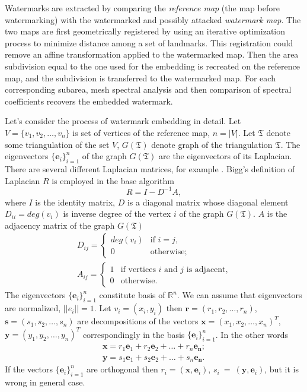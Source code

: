 \documentclass{article}
\begin{document}
Watermarks are extracted by comparing the \textit{reference map} (the map before watermarking) with the watermarked and possibly attacked \textit{watermark map}. The two maps are first geometrically registered by
using an iterative optimization process to minimize distance among a set of landmarks. This registration could remove an affine transformation applied to the watermarked map. Then the area subdivision 
equal to the one used for the embedding is recreated on the reference map, and the subdivision is transferred to the watermarked map. For each corresponding subarea, mesh spectral analysis and then comparison of
spectral coefficients recovers the embedded watermark.

Let's consider the process of watermark embedding in detail. Let $V = \{v_1, v_2, \dots, v_n\}$ is set of vertices of the reference map, $n = |V|$. Let $\mathfrak{T}$ denote some triangulation of the set $V$, 
$G(\mathfrak{T})$ denote graph of the triangulation $\mathfrak{T}$. The eigenvectors $\{\mathbf{e}_i\}_{i=1}^n$ of the graph $G(\mathfrak{T})$ are the eigenvectors of its Laplacian. 
There are several different Laplacian matrices, for example \cite{Biggs, Chung, Zhang}. Bigg's definition of Laplacian $R$ is employed in the base algorithm
$$R = I - D^{-1} A,$$ where $I$ is the identity matrix, $D$ is a diagonal matrix whose diagonal element $D_{ii} = deg(v_i)$ is inverse degree of the vertex $i$ of the graph $G(\mathfrak{T})$. 
$A$ is the adjacency matrix of the graph $G(\mathfrak{T})$
\begin{eqnarray*}
  D_{ij} = \begin{cases} deg(v_i) &\text{if $i = j$,} \\ 0 &\text{otherwise;} \end{cases} \\
  A_{ij} = \begin{cases} 1 &\text{if vertices $i$ and $j$ is adjacent,} \\ 0 &\text{otherwise.} \end{cases} 
\end{eqnarray*}
The eigenvectors $\{\mathbf{e}_i\}_{i=1}^n$ constitute basis of $\mathbb{R}^n$. We can assume that eigenvectors are normalized, $||e_i|| = 1$. 
Let $v_i = (x_i, y_i)$ then $\mathbf{r} = (r_1, r_2, \dots, r_n)$, $\mathbf{s} = (s_1, s_2, \dots, s_n)$ are decompositions of the vectors $\mathbf{x} = (x_1, x_2, \dots, x_n)^T$, 
$\mathbf{y} = (y_1, y_2, \dots, y_n)^T$ correspondingly in the basis $\{\mathbf{e}_i\}_{i=1}^n$. In the other words 
\begin{eqnarray*}
  \mathbf{x} = r_1 \mathbf{e}_1 + r_2 \mathbf{e}_2 + \dots + r_n \mathbf{e_n}; \\ 
  \mathbf{y} = s_1 \mathbf{e}_1 + s_2 \mathbf{e}_2 + \dots + s_n \mathbf{e_n}.  
\end{eqnarray*}
If the vectors $\{\mathbf{e}_i\}_{i=1}^n$ are orthogonal then $r_i = (\mathbf{x}, \mathbf{e}_i)$, $s_i~=~(\mathbf{y}, \mathbf{e}_i)$, but it is wrong in general case. 
\end{document}
